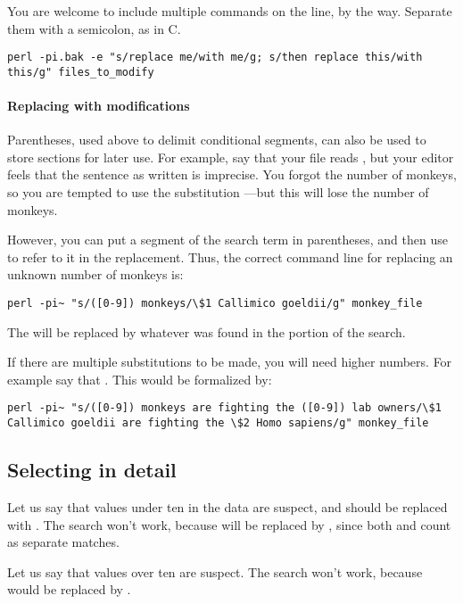 You are welcome to include multiple commands on the line, by the way.
Separate them with a semicolon, as in C.
\begin{lstlisting}
perl -pi.bak -e "s/replace me/with me/g; s/then replace this/with this/g" files_to_modify
\end{lstlisting}

\paragraph{Replacing with modifications} Parentheses, used above to
delimit conditional segments, can also be used to store sections for
later use. For example, say that your file reads , but your editor feels that the sentence as written is
imprecise. You forgot the number of monkeys, so you are tempted to use
the substitution ---but this will
lose the number of monkeys.

However, you can put a segment of the search term in parentheses, and
then use  to refer to it in the replacement. Thus, the
correct command line for replacing an unknown number of monkeys is:
\begin{lstlisting}
perl -pi~ "s/([0-9]) monkeys/\$1 Callimico goeldii/g" monkey_file
\end{lstlisting}
The  will be replaced by whatever was found in the
\ci{([0-9])} portion of the search.

If there are multiple substitutions to be made, you will need higher
numbers. For example say that . This would be formalized by: 
\begin{lstlisting}
perl -pi~ "s/([0-9]) monkeys are fighting the ([0-9]) lab owners/\$1 Callimico goeldii are fighting the \$2 Homo sapiens/g" monkey_file
\end{lstlisting}

\subsection{Selecting in detail}
Let us say that values under ten in the data are suspect, and should be
replaced with . The search  won't work,
because  will be replaced by , since both 
and  count as separate matches. 

Let us say that values over ten are suspect. The search
 won't work, because  would be replaced by
.

